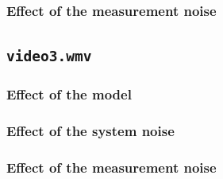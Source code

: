 \documentclass{ethz_report}
\begin{document}
\subsubsection*{Effect of the measurement noise}



\subsection*{\texttt{video3.wmv}}

\subsubsection*{Effect of the model}

\subsubsection*{Effect of the system noise}

\subsubsection*{Effect of the measurement noise}
\end{document}
